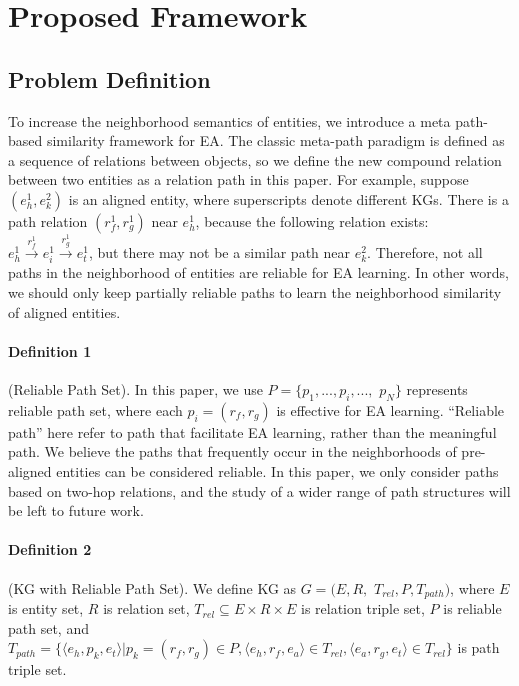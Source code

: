\documentclass{article}
\begin{document}
\section{Proposed Framework}
\label{sec3}

\subsection{Problem Definition}

To increase the neighborhood semantics of entities, we introduce a meta path-based similarity framework for EA. 
The classic meta-path paradigm is defined as a sequence of relations between objects, so we define the new compound relation between two entities as a relation path in this paper.
For example, suppose $(e^1_h, e^2_k)$ is an aligned entity, where superscripts denote different KGs.
There is a path relation $(r^1_f,r^1_g)$ near $e^1_h$, because the following relation exists: $e^1_h \overset{r^1_f}{\rightarrow} e^1_i \overset{r^1_g}{\rightarrow} e^1_t$, but there may not be a similar path near $e^2_k$.
Therefore, not all paths in the neighborhood of entities are reliable for EA learning. 
In other words, we should only keep partially reliable paths to learn the neighborhood similarity of aligned entities.


\paragraph{Definition 1} (Reliable Path Set).
In this paper, we use $P \!=\! \{ p_1,..., p_i, ..., $ $p_N \}$ represents reliable path set, where each $p_i \!=\! (r_f,r_g)$ is effective for EA learning. 
“Reliable path” here refer to path that facilitate EA learning, rather than the meaningful path. 
We believe the paths that frequently occur in the neighborhoods of pre-aligned entities can be considered reliable.
In this paper, we only consider paths based on two-hop relations, and the study of a wider range of path structures will be left to future work.


\paragraph{Definition 2} (KG with Reliable Path Set).
We define KG as $G \!=\! (E,R,$ $T_{rel}, P, T_{path})$, where $E$ is entity set, $R$ is relation set, $T_{rel} \!\subseteq\! E \!\times\! R \!\times\! E$ is relation triple set, $P$ is reliable path set, and $T_{path} \!=\! \{ \langle e_h,p_k,e_t \rangle | p_k \!=\! (r_f, r_g) \!\in\! P, \langle e_h,r_f,e_a \rangle \!\in\! T_{rel}, \langle e_a,r_g,e_t \rangle \!\in\! T_{rel}\}$ is path triple set. 
\end{document}
